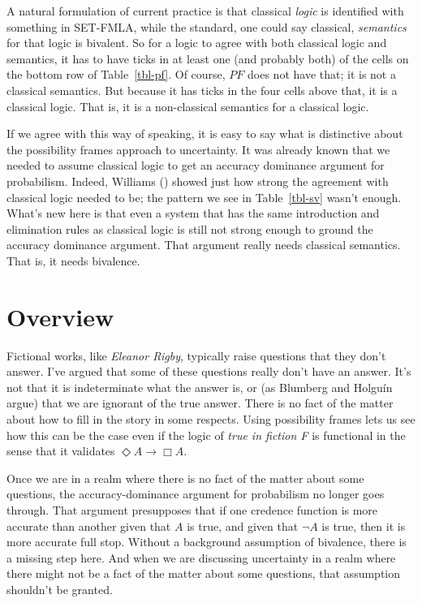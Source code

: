 \documentclass[
  11pt,
  letterpaper,
  DIV=11,
  numbers=noendperiod,
  twoside]{scrartcl}
\begin{document}
A natural formulation of current practice is that classical \emph{logic}
is identified with something in SET-FMLA, while the standard, one could
say classical, \emph{semantics} for that logic is bivalent. So for a
logic to agree with both classical logic and semantics, it has to have
ticks in at least one (and probably both) of the cells on the bottom row
of Table~\ref{tbl-pf}. Of course, \(PF\) does not have that; it is not a
classical semantics. But because it has ticks in the four cells above
that, it is a classical logic. That is, it is a non-classical semantics
for a classical logic.

If we agree with this way of speaking, it is easy to say what is
distinctive about the possibility frames approach to uncertainty. It was
already known that we needed to assume classical logic to get an
accuracy dominance argument for probabilism. Indeed, Williams
() showed just how strong the
agreement with classical logic needed to be; the pattern we see in
Table~\ref{tbl-sv} wasn't enough. What's new here is that even a system
that has the same introduction and elimination rules as classical logic
is still not strong enough to ground the accuracy dominance argument.
That argument really needs classical semantics. That is, it needs
bivalence.

\section{Overview}\label{overview}

Fictional works, like \emph{Eleanor Rigby}, typically raise questions
that they don't answer. I've argued that some of these questions really
don't have an answer. It's not that it is indeterminate what the answer
is, or (as Blumberg and Holguín argue) that we are ignorant of the true
answer. There is no fact of the matter about how to fill in the story in
some respects. Using possibility frames lets us see how this can be the
case even if the logic of \emph{true in fiction F} is functional in the
sense that it validates \(\Diamond A \rightarrow \Box A\).

Once we are in a realm where there is no fact of the matter about some
questions, the accuracy-dominance argument for probabilism no longer
goes through. That argument presupposes that if one credence function is
more accurate than another given that \(A\) is true, and given that
\(\neg A\) is true, then it is more accurate full stop. Without a
background assumption of bivalence, there is a missing step here. And
when we are discussing uncertainty in a realm where there might not be a
fact of the matter about some questions, that assumption shouldn't be
granted.
\end{document}
